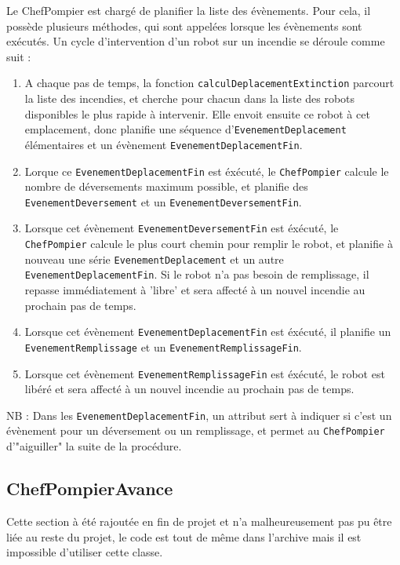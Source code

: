 \documentclass[12pt,a4paper]{article}
\begin{document}
Le ChefPompier est chargé de planifier la liste des évènements. Pour cela, il possède plusieurs méthodes, qui sont appelées lorsque les évènements sont exécutés. Un cycle d'intervention d'un robot sur un incendie se déroule comme suit : 
\begin{enumerate}
	\item A chaque pas de temps, la fonction \verb?calculDeplacementExtinction? parcourt la liste des incendies, et cherche pour chacun dans la liste des robots disponibles le plus rapide à intervenir. Elle envoit ensuite ce robot à cet emplacement, donc planifie une séquence d'\verb?EvenementDeplacement? élémentaires et un évènement \verb?EvenementDeplacementFin?.
	\item Lorque ce \verb?EvenementDeplacementFin? est éxécuté, le \verb?ChefPompier? calcule le nombre de déversements maximum possible, et planifie des \verb?EvenementDeversement? et un \verb?EvenementDeversementFin?.
	\item Lorsque cet évènement \verb?EvenementDeversementFin? est éxécuté, le \verb?ChefPompier? calcule le plus court chemin pour remplir le robot, et planifie à nouveau une série \verb?EvenementDeplacement? et un autre \verb?EvenementDeplacementFin?. Si le robot n'a pas besoin de remplissage, il repasse immédiatement à 'libre' et sera affecté à un nouvel incendie au prochain pas de temps.
	\item Lorsque cet évènement \verb?EvenementDeplacementFin? est éxécuté, il planifie un \verb?EvenementRemplissage? et un \verb?EvenementRemplissageFin?.
	\item Lorsque cet évènement \verb?EvenementRemplissageFin? est éxécuté, le robot est libéré et sera affecté à un nouvel incendie au prochain pas de temps.
\end{enumerate}

NB : Dans les \verb?EvenementDeplacementFin?, un attribut sert à indiquer si c'est un évènement pour un déversement ou un remplissage, et permet au \verb?ChefPompier? d'"aiguiller" la suite de la procédure.


\subsection{ChefPompierAvance}

Cette section à été rajoutée en fin de projet et n'a malheureusement pas pu être liée au reste du projet, le code est tout de même dans l'archive mais il est impossible d'utiliser cette classe.\\
\end{document}
